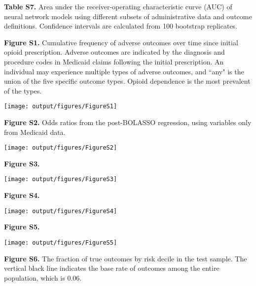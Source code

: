 \documentclass[10pt, letter]{article}
\begin{document}
\newpage

\textbf{Table S7.} Area under the receiver-operating characteristic curve (AUC) of neural network models using different subsets of administrative data and outcome definitions. Confidence intervals are calculated from 100 bootstrap replicates.

\scriptsize

\normalsize

\newpage

\textbf{Figure S1.} Cumulative frequency of adverse outcomes over time since initial opioid prescription. Adverse outcomes are indicated by the diagnosis and procedure codes in Medicaid claims following the initial prescription. An individual may experience multiple types of adverse outcomes, and ``any" is the union of the five specific outcome types. Opioid dependence is the most prevalent of the types.

\texttt{[image: output/figures/FigureS1]}

\newpage

\textbf{Figure S2.} Odds ratios from the post-BOLASSO regression, using variables only from Medicaid data.

\texttt{[image: output/figures/FigureS2]}

\newpage

\textbf{Figure S3.}

\texttt{[image: output/figures/FigureS3]}

\newpage

\textbf{Figure S4.}

\texttt{[image: output/figures/FigureS4]}

\newpage

\textbf{Figure S5.}

\texttt{[image: output/figures/FigureS5]}

\newpage

\textbf{Figure S6.} The fraction of true outcomes by risk decile in the test sample. The vertical black line indicates the base rate of outcomes among the entire population, which is 0.06.

\end{document}
